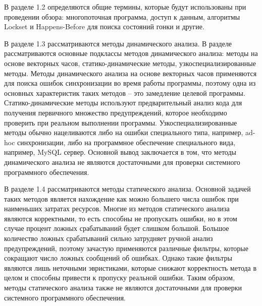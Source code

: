 В разделе 1.2 определяются общие термины, которые будут использованы при проведении обзора: многопоточная программа, доступ к данным, алгоритмы Lockset и Happens-Before для поиска состояний гонки и другие.

В разделе 1.3 рассматриваются методы динамического анализа.
В разделе рассматриваются основные подклассы методов динамического анализа: методы на основе векторных часов, статико-динамические методы, узкоспециализированные методы.
Методы динамического анализа на основе векторных часов применяются для поиска ошибок синхронизации во время работы программы, поэтому одна из основных характеристик таких методов -- это замедление целевой программы. 
Статико-динамические методы используют предварительный анализ кода для получения первичного множество предупреждений, которое необходимо проверить при реальном выполнении программы.
Узкоспециализированные методы обычно нацеливаются либо на ошибки специального типа, например, ad-hoc синхронизации, либо на программное обеспечение специального вида, например, MySQL сервер.
Основной вывод заключается в том, что методы динамического анализа не являются достаточными для проверки системного программного обеспечения.

В разделе 1.4 рассматриваются методы статического анализа.
Основной задачей таких методов является нахождение как можно большего числа ошибок при наименьших затратах ресурсов. 
Многие из методов статического анализа являются корректными, то есть способны не пропускать ошибки, но в этом случае процент ложных срабатываний будет слишком большой.
Большое количество ложных срабатываний сильно затрудняет ручной анализ предупреждений, поэтому зачастую применяются различные фильтры, которые сокращают число ложных сообщений об ошибках.
Однако такие фильтры являются лишь неточными эвристиками, которые снижают корректность метода в целом и способны привести к пропуску реальной ошибки.
Таким образом, методы статического анализа также не являются достаточными для проверки системного программного обеспечения.

